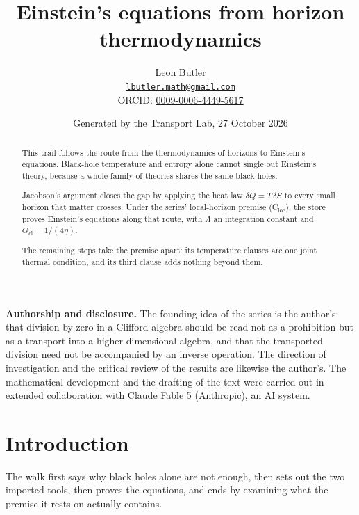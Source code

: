 \documentclass[11pt]{article}
\title{\bfseries Einstein's equations from horizon thermodynamics}
\author{Leon Butler\\ \normalsize\href{mailto:lbutler.math@gmail.com}{\texttt{lbutler.math@gmail.com}}\\ \normalsize ORCID: \href{https://orcid.org/0009-0006-4449-5617}{0009-0006-4449-5617}}
\date{Generated by the Transport Lab, 27 October 2026}
\theoremstyle{definition}
\theoremstyle{plain}
\begin{document}
\maketitle
\begin{abstract}
\normalsize
This trail follows the route from the thermodynamics of horizons to Einstein's equations. Black-hole temperature and entropy alone cannot single out Einstein's theory, because a whole family of theories shares the same black holes.

Jacobson's argument closes the gap by applying the heat law $\delta Q = T\,\delta S$ to every small horizon that matter crosses. Under the series' local-horizon premise (C$_{\mathrm{loc}}$), the store proves Einstein's equations along that route, with $\Lambda$ an integration constant and $G_{\mathrm{cl}} = 1/(4\eta)$.

The remaining steps take the premise apart: its temperature clauses are one joint thermal condition, and its third clause adds nothing beyond them.
\end{abstract}
\newpage
\noindent \textbf{Authorship and disclosure. }The founding idea of the series is the author's: that division by zero in a Clifford algebra should be read not as a prohibition but as a transport into a higher-dimensional algebra, and that the transported division need not be accompanied by an inverse operation. The direction of investigation and the critical review of the results are likewise the author's. The mathematical development and the drafting of the text were carried out in extended collaboration with Claude Fable 5 (Anthropic), an AI system.

\noindent{}
\newpage

\section*{Introduction}
The walk first says why black holes alone are not enough, then sets out the two imported tools, then proves the equations, and ends by examining what the premise it rests on actually contains.
\end{document}
